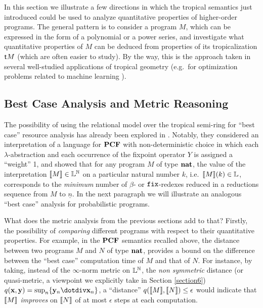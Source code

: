 

In this section we illustrate a few directions in which the tropical semantics just introduced could be used to analyze quantitative properties of higher-order programs. 
The general pattern is to consider a program $M$, which can be expressed in the form of a polynomial or a power series, and 
investigate what quantitative properties of $M$ can be deduced from properties of its tropicalization $\mathsf{t} M$ (which are often easier to study).
By the way, this is the approach taken in several well-studied applications of tropical geometry (e.g.~for optimization problems related to machine learning \cite{Pachter2004, Zhang2018, Maragos2021}).



\subsection{Best Case Analysis and Metric Reasoning}

The possibility of using the relational model over the tropical semi-ring for ``best case'' resource analysis has already been explored in \cite{Manzo2013}. Notably, they considered an interpretation of a language for $\mathbf{PCF}$ with non-deterministic choice in which each $\lambda$-abstraction and each occurrence of the fixpoint operator $Y$ is assigned a ``weight'' 1, and showed that for any program $M$ of type $\mathbf{nat}$, 
the value of the interpretation $\llbracket M\rrbracket\in \mathbb{L}^{\mathbb{N}}$ on a particular natural number $k$, i.e.~$\llbracket M\rrbracket(k)\in \mathbb{L}$, corresponds to the \emph{minimum} number of $\beta$- or $\mathtt{fix}$-redexes reduced in a reductions sequence from $M$ to $\underline n$. 
In the next paragraph we will illustrate an analogous ``best case'' analysis for probabilistic programs.

What does the metric analysis from the previous sections add to that? Firstly, the possibility of \emph{comparing} different programs with respect to their quantitative properties. For example, in the $\mathbf{PCF}$ semantics recalled above, the distance between two programs $M$ and $N$ of type $\mathbf{nat}$, provides a bound on the difference between the  ``best case'' computation time of $M$ and that of $N$. For instance, by taking, instead of the $\infty$-norm metric on $\mathbb{L}^{\mathbb{N}}$,  
the \emph{non symmetric} distance (or quasi-metric, a viewpoint we explicitly take in Section \ref{section6}) $q(\B x, \B y)=\sup_{n}\{\B y_{n}\dotdiv \B x_{n}\}$, a ``distance'' $q(\llbracket M\rrbracket,\llbracket N\rrbracket)\leq \epsilon$ would indicate that $\llbracket M\rrbracket$ \emph{improves} on $\llbracket N\rrbracket$ of at most $\epsilon$ steps at each computation. 

